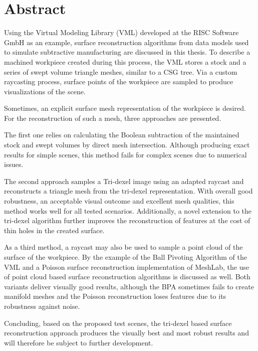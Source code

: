 \pagebreak

\chapter*{Abstract}

Using the Virtual Modeling Library (VML) developed at the RISC Software GmbH as an example, surface reconstruction algorithms from data models used to simulate subtractive manufacturing are discussed in this thesis.
To describe a machined workpiece created during this process, the VML stores a stock and a series of swept volume triangle meshes, similar to a CSG tree.
Via a custom raycasting process, surface points of the workpiece are sampled to produce visualizations of the scene.

Sometimes, an explicit surface mesh representation of the workpiece is desired.
For the reconstruction of such a mesh, three approaches are presented.

The first one relies on calculating the Boolean subtraction of the maintained stock and swept volumes by direct mesh intersection.
Although producing exact results for simple scenes, this method fails for complex scenes due to numerical issues.

The second approach samples a Tri-dexel image using an adapted raycast and reconstructs a triangle mesh from the tri-dexel representation.
With overall good robustness, an acceptable visual outcome and excellent mesh qualities, this method works well for all tested scenarios.
Additionally, a novel extension to the tri-dexel algorithm further improves the reconstruction of features at the cost of thin holes in the created surface.

As a third method, a raycast may also be used to sample a point cloud of the surface of the workpiece.
By the example of the Ball Pivoting Algorithm of the VML and a Poisson surface reconstruction implementation of MeshLab, the use of point cloud based surface reconstruction algorithms is discussed as well.
Both variants deliver visually good results, although the BPA sometimes fails to create manifold meshes and the Poisson reconstruction loses features due to its robustness against noise.

Concluding, based on the proposed test scenes, the tri-dexel based surface reconstruction approach produces the visually best and most robust results and will therefore be subject to further development.
